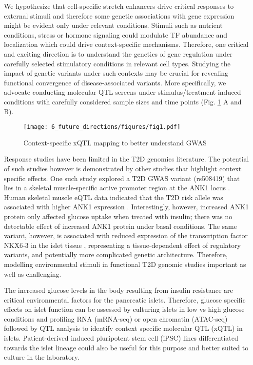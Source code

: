 We hypothesize that cell-specific stretch enhancers drive critical responses to external stimuli and therefore some genetic associations with gene expression might be evident only under relevant conditions. Stimuli such as nutrient conditions, stress or hormone signaling could modulate TF abundance and localization which could drive context-specific mechanisms. Therefore, one critical and exciting direction is to understand the genetics of gene regulation under carefully selected stimulatory conditions in relevant cell types. Studying the impact of genetic variants under such contexts may be crucial for revealing functional convergence of disease-associated variants. More specifically, we advocate conducting molecular QTL screens under stimulus/treatment induced conditions with carefully considered sample sizes and time points (Fig. \ref{fig:c6_f1} A and B). 


\begin{figure}
            \centering
            \texttt{[image: 6\_future\_directions/figures/fig1.pdf]}
            \caption{Context-specific xQTL mapping to better understand GWAS}
            \label{fig:c6_f1}
\end{figure}


Response studies have been limited in the T2D genomics literature. The potential of such studies however is demonstrated by other studies that highlight context specific effects. One such study explored a T2D GWAS variant (rs508419) that lies in a skeletal muscle-specific active promoter region at the ANK1 locus \cite{scottGeneticRegulatorySignature2016, yanNovelTypeDiabetes2016}. Human skeletal muscle eQTL data indicated that the T2D risk allele was associated with higher ANK1 expression \cite{scottGeneticRegulatorySignature2016}. Interestingly, however, increased ANK1 protein only affected glucose uptake when treated with insulin; there was no detectable effect of increased ANK1 protein under basal conditions. The same variant, however, is associated with reduced expression of the transcription factor NKX6-3 in the islet tissue \cite{scottGeneticRegulatorySignature2016, varshneyGeneticRegulatorySignatures2017}, representing a tissue-dependent effect of regulatory variants, and potentially more complicated genetic architecture. Therefore, modelling environmental stimuli in functional T2D genomic studies important as well as challenging.
        
The increased glucose levels in the body resulting from insulin resistance are critical environmental factors for the pancreatic islets. Therefore, glucose specific effects on islet function can be assessed by culturing islets in low vs high glucose conditions and profiling RNA (mRNA-seq) or open chromatin (ATAC-seq) followed by QTL analysis to identify context specific molecular QTL (xQTL) in islets. Patient-derived induced pluripotent stem cell (iPSC) lines differentiated towards the islet lineage could also be useful for this purpose and better suited to culture in the laboratory. 
                        
